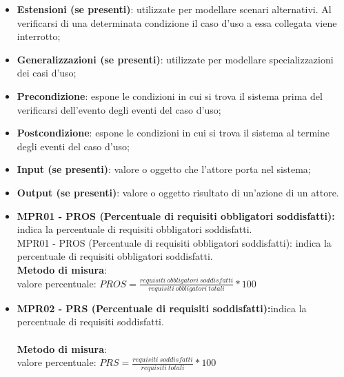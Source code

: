 \begin{itemize}
    \item \textbf{Estensioni (se presenti)}: utilizzate per modellare scenari alternativi. Al verificarsi di una determinata condizione il caso d'uso a essa collegata viene interrotto;
    \item \textbf{Generalizzazioni (se presenti)}: utilizzate per modellare specializzazioni dei casi d'uso;
    \item \textbf{Precondizione}: espone le condizioni in cui si trova il sistema prima del verificarsi dell'evento degli eventi del caso d'uso;
    \item \textbf{Postcondizione}: espone le condizioni in cui si trova il sistema al termine degli eventi del caso d'uso;
    \item \textbf{Input (se presenti)}: valore o oggetto che l'attore porta nel sistema;
    \item \textbf{Output (se presenti)}: valore o oggetto risultato di un'azione di un attore.
\end{itemize}
\begin{itemize}
    \item \textbf{MPR01 - PROS (Percentuale di requisiti obbligatori soddisfatti):} indica la percentuale di requisiti obbligatori soddisfatti.\\
          MPR01 - PROS (Percentuale di requisiti obbligatori soddisfatti): indica la percentuale di requisiti obbligatori soddisfatti.
          \\\textbf{Metodo di misura}:\\valore percentuale: $PROS = \frac{requisiti \ obbligatori \ soddisfatti}{requisiti \ obbligatori \ totali} * 100$
    \item \textbf{MPR02 - PRS (Percentuale di requisiti soddisfatti):}indica la percentuale di requisiti soddisfatti.\\
          \\\textbf{Metodo di misura}:\\valore percentuale: $PRS = \frac{requisiti \ soddisfatti}{requisiti \ totali} * 100$
\end{itemize}
